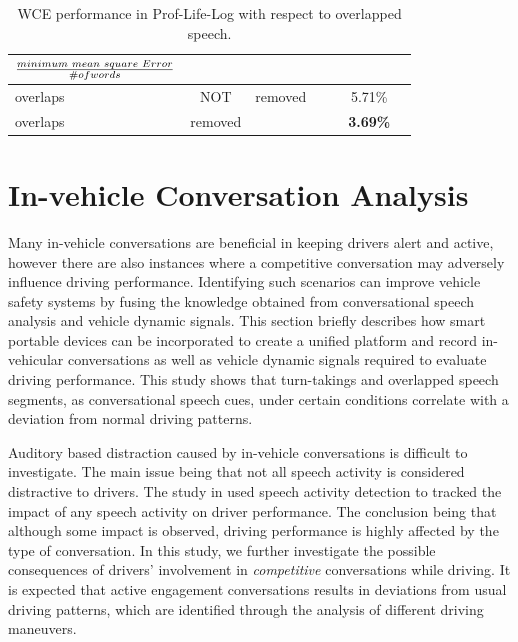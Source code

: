 \begin{table}[h!]
	\centering
	\renewcommand{\tabcolsep}{2.5 mm}
	\renewcommand{\arraystretch}{1.3}
	\vspace{0mm}
	\caption {WCE performance in Prof-Life-Log with respect to overlapped speech.}
	\label{tab:wce_ovl}
	\vspace{2mm}
	\begin{tabular}{p{0.8cm}*{6}{c}}
		\bf $\frac{minimum\hspace{1mm} mean \hspace{1mm} square \hspace{1mm} Error}{\# of words}$\\ \hline \hline
		overlaps & NOT&\hspace{-7mm}removed	&  &     &    5.71\% \\ 
		overlaps&removed	&		&	&     &    \bf3.69\% \\ \hline
	\end{tabular}
	\vspace{-1mm}
\end{table}

\newpage

\section{In-vehicle Conversation Analysis}
\label{sec:invehicle}
Many in-vehicle conversations are beneficial in keeping drivers alert and active, however there are also instances where a competitive conversation may adversely influence driving performance. 
Identifying such scenarios can improve vehicle safety systems by fusing the knowledge obtained from conversational speech analysis and vehicle dynamic signals. 
This section briefly describes how smart portable devices can be incorporated to create a unified platform and record in-vehicular conversations as well as vehicle dynamic signals required to evaluate driving performance. 
This study shows that turn-takings and overlapped speech segments, as conversational speech cues, under certain conditions correlate with a deviation from normal driving patterns. 

Auditory based distraction caused by in-vehicle conversations is difficult to investigate. The main issue being that not all speech activity is considered distractive to drivers. 
The study in \cite{ESPA} used speech activity detection to tracked the impact of any speech activity on driver performance. 
The conclusion being that although some impact is observed, driving performance is highly affected by the type of conversation. 
In this study, we further investigate the possible consequences of drivers' involvement in \emph{competitive} conversations while driving. 
It is expected that active engagement conversations results in deviations from usual driving patterns, which are identified through the analysis of different driving maneuvers. 

